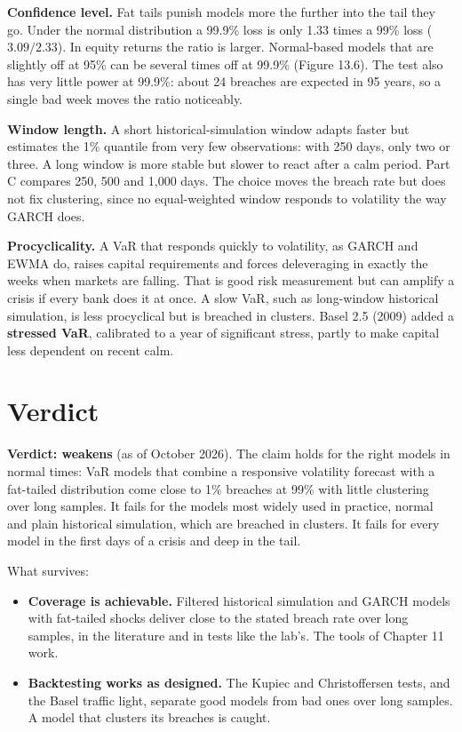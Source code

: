 \textbf{Confidence level.} Fat tails punish models more the further into the tail they go. Under the normal distribution a 99.9\% loss is only 1.33 times a 99\% loss ($3.09/2.33$). In equity returns the ratio is larger. Normal-based models that are slightly off at 95\% can be several times off at 99.9\% (Figure 13.6). The test also has very little power at 99.9\%: about 24 breaches are expected in 95 years, so a single bad week moves the ratio noticeably.

\textbf{Window length.} A short historical-simulation window adapts faster but estimates the 1\% quantile from very few observations: with 250 days, only two or three. A long window is more stable but slower to react after a calm period. Part C compares 250, 500 and 1,000 days. The choice moves the breach rate but does not fix clustering, since no equal-weighted window responds to volatility the way GARCH does.

\textbf{Procyclicality.} A VaR that responds quickly to volatility, as GARCH and EWMA do, raises capital requirements and forces deleveraging in exactly the weeks when markets are falling. That is good risk measurement but can amplify a crisis if every bank does it at once. A slow VaR, such as long-window historical simulation, is less procyclical but is breached in clusters. Basel 2.5 (2009) added a \textbf{stressed VaR}, calibrated to a year of significant stress, partly to make capital less dependent on recent calm.

\section{Verdict}
\label{sec:13-verdict}

\begin{callout}
\textbf{Verdict: weakens} (as of October 2026). The claim holds for the right models in normal times: VaR models that combine a responsive volatility forecast with a fat-tailed distribution come close to 1\% breaches at 99\% with little clustering over long samples. It fails for the models most widely used in practice, normal and plain historical simulation, which are breached in clusters. It fails for every model in the first days of a crisis and deep in the tail.
\end{callout}

What survives:

\begin{itemize}
  \item \textbf{Coverage is achievable.} Filtered historical simulation and GARCH models with fat-tailed shocks deliver close to the stated breach rate over long samples, in the literature and in tests like the lab's. The tools of Chapter 11 work.
  \item \textbf{Backtesting works as designed.} The Kupiec and Christoffersen tests, and the Basel traffic light, separate good models from bad ones over long samples. A model that clusters its breaches is caught.
\end{itemize}

